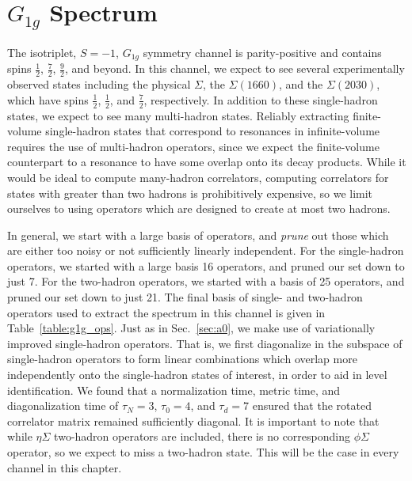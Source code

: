 \section{$G_{1g}$ Spectrum}
The isotriplet, $S=-1$, $G_{1g}$ symmetry channel is parity-positive and contains spins $\frac{1}{2}$, $\frac{7}{2}$, $\frac{9}{2}$, and beyond. In this channel, we expect to see several experimentally observed states including the physical $\Sigma$, the $\Sigma(1660)$, and the $\Sigma(2030)$, which have spins $\frac{1}{2}$, $\frac{1}{2}$, and $\frac{7}{2}$, respectively. In addition to these single-hadron states, we expect to see many multi-hadron states. Reliably extracting finite-volume single-hadron states that correspond to resonances in infinite-volume requires the use of multi-hadron operators, since we expect the finite-volume counterpart to a resonance to have some overlap onto its decay products. While it would be ideal to compute many-hadron correlators, computing correlators for states with greater than two hadrons is prohibitively expensive, so we limit ourselves to using operators which are designed to create at most two hadrons.

In general, we start with a large basis of operators, and \emph{prune} out those which are either too noisy or not sufficiently linearly independent. For the single-hadron operators, we started with a large basis 16 operators, and pruned our set down to just 7. For the two-hadron operators, we started with a basis of 25 operators, and pruned our set down to just 21. The final basis of single- and two-hadron operators used to extract the spectrum in this channel is given in Table~\ref{table:g1g_ops}. Just as in Sec.~\ref{sec:a0}, we make use of variationally improved single-hadron operators. That is, we first diagonalize in the subspace of single-hadron operators to form linear combinations which overlap more independently onto the single-hadron states of interest, in order to aid in level identification. We found that a normalization time, metric time, and diagonalization time of $\tau_N=3$, $\tau_0=4$, and $\tau_d=7$ ensured that the rotated correlator matrix remained sufficiently diagonal. It is important to note that while $\eta\Sigma$ two-hadron operators are included, there is no corresponding $\phi\Sigma$ operator, so we expect to miss a two-hadron state. This will be the case in every channel in this chapter.


